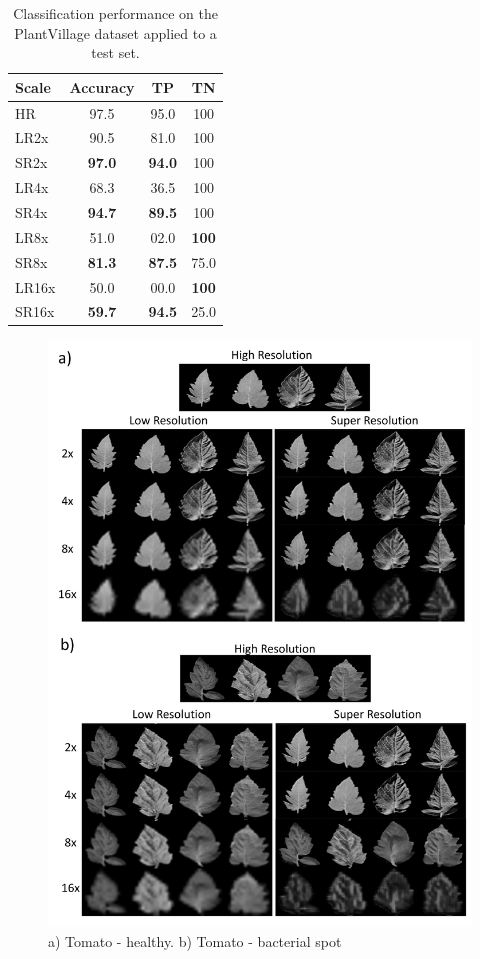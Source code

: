 \documentclass[10pt,twocolumn,letterpaper]{article}
\begin{document}
\begin{table}[h]
\caption{Classification performance on the PlantVillage dataset applied to a test set.}
\label{tab:results}
\centering
\begin{tabular}{|l|c|c|c|}
\hline
  Scale   & Accuracy & TP & TN \\
\hline
\hline
HR & 97.5 & 95.0 & 100 \\
\hline
LR2x & 90.5 & 81.0 & 100 \\
SR2x & \textbf{97.0} & \textbf{94.0} & 100 \\
\hline
LR4x & 68.3 & 36.5 & 100 \\
SR4x & \textbf{94.7} & \textbf{89.5} & 100 \\
\hline
LR8x & 51.0 & 02.0 & \textbf{100} \\
SR8x & \textbf{81.3} & \textbf{87.5} & 75.0 \\
\hline
LR16x & 50.0 & 00.0 & \textbf{100} \\
SR16x & \textbf{59.7} & \textbf{94.5} & 25.0 \\
\hline
\end{tabular}
\end{table}

\begin{figure}[h]
\begin{center}
\includegraphics[scale=0.40]{results/srimages.pdf}
\end{center}
   \caption{a) Tomato - healthy. b) Tomato - bacterial spot} 
\label{fig:srimages}
\end{figure}
\end{document}

